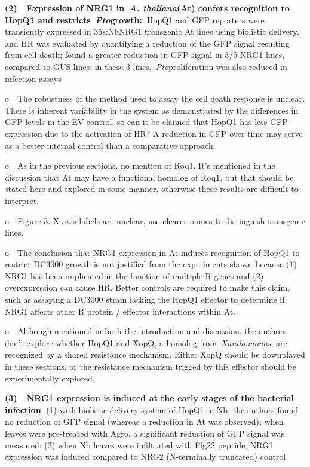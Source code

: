 \documentclass[10pt]{article}
\begin{document}
\textbf{(2)~~Expression of NRG1 in~\emph{A. thaliana}(At) confers
recognition to HopQ1 and restricts~\emph{Pto}growth:~}HopQ1 and GFP
reporters were transiently expressed in 35s:NbNRG1 transgenic At lines
using biolistic delivery, and HR was evaluated by quantifying a
reduction of the GFP signal resulting from cell death; found a greater
reduction in GFP signal in 3/5 NRG1 lines, compared to GUS lines; in
these 3 lines,~\emph{Pto}proliferation was also reduced in infection
assays

o~~The robustness of the method used to assay the cell death response is
unclear. There is inherent variability in the system as demonstrated by
the differences in GFP levels in the EV control, so can it be claimed
that HopQ1 has less GFP expression due to the activation of HR? A
reduction in GFP over time may serve as a better internal control than a
comparative approach.~

o~~As in the previous sections, no mention of Roq1. It's mentioned in
the discussion that At may have a functional homolog of Roq1, but that
should be stated here and explored in some manner, otherwise these
results are difficult to interpret.~

o~~Figure 3. X axis labels are unclear, use clearer names to distinguish
transgenic lines.~

o~~The conclusion that NRG1 expression in At induces recognition of
HopQ1 to restrict DC3000 growth is not justified from the experiments
shown because (1) NRG1 has been implicated in the function of multiple R
genes and (2) overexpression can cause HR. Better controls are required
to make this claim, such as assaying a DC3000 strain lacking the HopQ1
effector to determine if NRG1 affects other R protein / effector
interactions within At.

o~~Although mentioned in both the introduction and discussion, the
authors don't explore whether HopQ1 and XopQ, a homolog
from~\emph{Xanthomonas}, are recognized by a shared resistance
mechanism. Either XopQ should be downplayed in these sections, or the
resistance mechanism trigged by this effector should be experimentally
explored.

\textbf{(3)~~NRG1 expression is induced at the early stages of the
bacterial infection}: (1) with biolistic delivery system of HopQ1 in Nb,
the authors found no reduction of GFP signal (whereas a reduction in At
was observed); when leaves were pre-treated with Agro, a significant
reduction of GFP signal was measured; (2) when Nb leaves were
infiltrated with Flg22 peptide, NRG1 expression was induced compared to
NRG2 (N-terminally truncated) control
\end{document}
